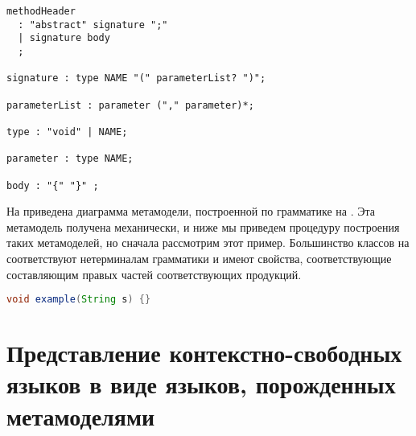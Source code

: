 \begin{lstlisting}[language=ANTLR,float,label=java-method-header,caption=Упрощенный синтаксис описания методов в языке \tool{Java}.]
methodHeader
  : "abstract" signature ";"
  | signature body
  ;

signature : type NAME "(" parameterList? ")";
  
parameterList : parameter ("," parameter)*;
  
type : "void" | NAME;
  
parameter : type NAME;
  
body : "{" "}" ;
\end{lstlisting}

На  приведена диаграмма метамодели, построенной по грамматике на . Эта метамодель получена механически, и ниже мы приведем процедуру построения таких метамоделей, но сначала рассмотрим этот пример. Большинство классов на  соответствуют нетерминалам грамматики и имеют свойства, соответствующие составляющим правых частей соответствующих продукций.

\begin{lstlisting}[language=Java,float,label=java-method-header-example,caption=Пример заголовка метода.]
void example(String s) {}
\end{lstlisting}



\section{Представление контекстно-свободных языков в виде языков, порожденных метамоделями}




